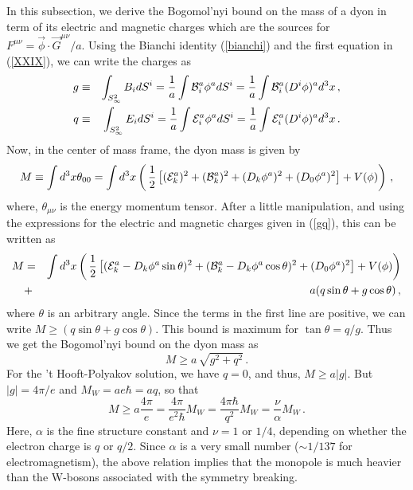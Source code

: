 In this subsection, we derive the Bogomol'nyi bound \cite{bogomol} on
the mass of a dyon in term of its electric and magnetic charges which
are the sources for $F^{\mu\nu}=\vec{\phi}\cdot \vec{G}^{\mu\nu}/a$. 
Using the Bianchi identity (\ref{bianchi}) and the first equation in
(\ref{XXIX}), we can write the charges as 
\begin{eqnarray} 
g&\equiv&\int_{S^2_\infty}B_i dS^i=\frac{1}{a}\int{\cal B}^a_i\phi^a
dS^i = \frac{1}{a} \int {\cal B}^a_i (D^i \phi)^a d^3x\,,
\nonumber\\
q&\equiv&\int_{S^2_\infty}E_i dS^i=\frac{1}{a}\int{\cal E}^a_i\phi^a
dS^i = \frac{1}{a} \int {\cal E}^a_i (D^i \phi)^a d^3x\,. 
\label{gq}
\end{eqnarray}
Now, in the center of mass frame, the dyon mass is given by 
$$
M\equiv \int d^3x \theta_{00}= \int d^3x \left(\,\frac{1}{2}
\left[({\cal E}^a_k)^2+({\cal B}^a_k)^2 + (D_k\phi^a)^2 + 
(D_0\phi^a)^2 \right]+ V(\phi) \right)\,,
$$
where, $\theta_{\mu\nu}$ is the energy momentum tensor. After a little
manipulation, and using the expressions for the electric and magnetic
charges given in (\ref{gq}), this can be written 
as 
\begin{eqnarray}
M&=&\int d^3x \left(\,\frac{1}{2}\left[({\cal E}^a_k -
D_k\phi^a\sin\theta)^2 + ({\cal B}^a_k-D_k\phi^a\cos\theta )^2
+(D_0\phi^a)^2\right] + V(\phi) \right)
\nonumber\\
&+& a (q \sin \theta + g \cos \theta )\,,
\label{M-bog}
\end{eqnarray}
where $\theta$ is an arbitrary angle.  Since the terms in the first
line are positive, we can write $M\geq (q \sin \theta + g \cos \theta
)$. This bound is maximum for $\tan\theta = q/g$. Thus we get the
Bogomol'nyi bound on the dyon mass as
$$
M \geq a\, \sqrt{g^2 + q^2}\,.
$$
For the 't Hooft-Polyakov solution, we have $q = 0$, and thus, $M \geq
a|g|$. But $|g|=4\pi/e$ and $M_W=ae\hbar=aq$, so that 
$$
M \geq a \frac{4 \pi}{e} = \frac{4 \pi}{e^{2}\hbar} M_{W} =
\frac{4 \pi \hbar}{q^{2}} M_{W} = \frac{\nu}{\alpha} M_{W}\,.
$$
Here, $\alpha$ is the fine structure constant and $\nu=1$ or $1/4$,
depending on whether the electron charge is $q$ or $q/2$. Since
$\alpha$ is a very small number ($\sim 1/137$ for electromagnetism),
the above relation implies that the monopole is much heavier than the
W-bosons associated with the symmetry breaking. 

